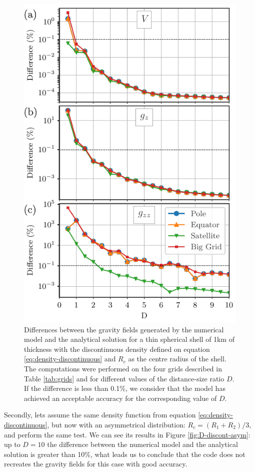 \documentclass[extra]{gji}
\begin{document}
\begin{figure}
\centering
\includegraphics[width=0.9\linewidth]{figures/Ddiscontinuous-symmetric-differences.pdf}
\caption{
    Differences between the gravity fields generated by the numerical model and the analytical solution for a thin spherical shell of 1km of thickness with the discontinuous density defined on equation \ref{eq:density-discontinuous} and $R_c$ as the centre radius of the shell. The computations were performed on the four grids described in Table \ref{tab:grids} and for different values of the distance-size ratio $D$. If the difference is less than 0.1\%, we consider that the model has achieved an acceptable accuracy for the corresponding value of $D$.
}
\label{fig:D-discont-sym}
\end{figure}

Secondly, lets assume the same density function from equation \ref{eq:density-discontinuous}, but now with an asymmetrical distribution: $R_c = (R_1 + R_2)/3$, and perform the same test.
We can see its results in Figure \ref{fig:D-discont-asym}: up to $D=10$ the difference between the numerical model and the analytical solution is greater than 10\%, what
leads us to conclude that the code does not recreates the gravity fields for this case with good accuracy.
\end{document}
